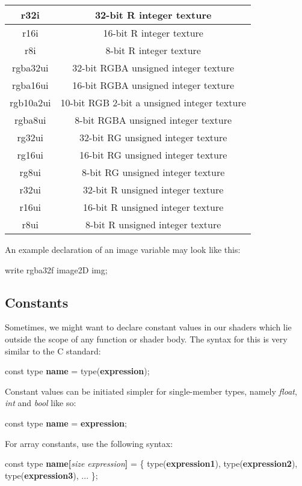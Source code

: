 \documentclass{article}
\newcommand{\SyntaxBox}[1]
{	
	\begin{center}
	\colorbox{orange!60}
	{
		\begin{minipage}{\linewidth}
		\hfill
		\begin{tabbing}
		#1
		\end{tabbing}
		\end{minipage}
	}
	\end{center}
}
\begin{document}
\begin{table}[hp]
{\begin{tabular} {| c | c |}
	r32i & 32-bit R integer texture \\ \hline
	r16i & 16-bit R integer texture \\ \hline
	r8i & 8-bit R integer texture \\ \hline
	rgba32ui & 32-bit RGBA unsigned integer texture \\ \hline
	rgba16ui & 16-bit RGBA unsigned integer texture \\ \hline
	rgb10a2ui & 10-bit RGB 2-bit a unsigned integer texture \\ \hline
	rgba8ui & 8-bit RGBA unsigned integer texture \\ \hline
	rg32ui & 32-bit RG unsigned integer texture \\ \hline
	rg16ui & 16-bit RG unsigned integer texture \\ \hline
	rg8ui & 8-bit RG unsigned integer texture \\ \hline
	r32ui & 32-bit R unsigned integer texture \\ \hline
	r16ui & 16-bit R unsigned integer texture \\ \hline
	r8ui & 8-bit R unsigned integer texture \\ \hline
\end{tabular}
}
\end{table}

An example declaration of an image variable may look like this:

\begin{CodeBox}
write rgba32f image2D img;
\end{CodeBox}

\subsection{Constants}
Sometimes, we might want to declare constant values in our shaders which lie outside the scope of any function or shader body. The syntax for this is very similar to the C standard:

\SyntaxBox
{
	const type \textbf{name} = type(\textbf{expression});
}

Constant values can be initiated simpler for single-member types, namely \textit{float}, \textit{int} and \textit{bool}  like so:

\SyntaxBox
{
	const type \textbf{name} = \textbf{expression};
}

For array constants, use the following syntax:

\SyntaxBox
{
	const type \textbf{name[}\textit{size expression}\textbf{]} = \{ type(\textbf{expression1}), type(\textbf{expression2}), type(\textbf{expression3}), ... \};
}
\end{document}
